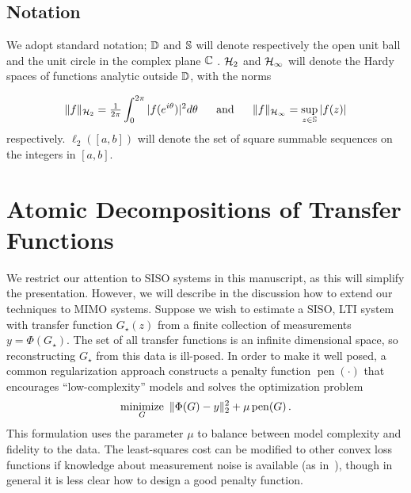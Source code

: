 \subsection*{Notation}\label{sec:notation}

We adopt standard notation; $\mathbb{D}$ and $\mathbb{S}$ will denote respectively the open
unit ball and the unit circle in the complex plane $\mathbb{C}$ . $\mathcal{H}_2$ and
$\mathcal{H}_\infty$ will denote the Hardy spaces of functions analytic outside $\mathbb{D}$,
with the norms

\[\|f\|_{\mathcal{H}_2} = \tfrac{1}{2\pi} \int_0^{2\pi} |f(e^{i\theta})|^2 d\theta~~~~~\mbox{and}~~~~~\|f\|_{\mathcal{H}_\infty} = \sup_{z\in\mathbb{S}} |f(z)|\]
respectively.  $\ell_2([a,b])$ will denote the set of square summable sequences on the integers in $[a, b]$.

\section{Atomic Decompositions of Transfer Functions}\label{sec:atomic-def}
We restrict our attention to SISO systems in this manuscript, as this will simplify the presentation.  However, we will describe in the discussion how to extend our techniques to MIMO systems.  Suppose we wish to estimate a SISO, LTI system with transfer function $G_\star(z)$ from a finite collection of measurements $y=\Phi(G_\star)$.  The set of all transfer functions is an infinite dimensional space, so reconstructing $G_\star$ from this data is ill-posed.  In order to make it well posed, a common regularization approach constructs a penalty function $\operatorname{pen}(\cdot)$ that encourages ``low-complexity'' models and solves the optimization problem
\begin{equation}\label{eq:regularized}
	\mathop{\operatorname{minimize}}_G~\|\Phi(G)-y\|_2^2 + \mu \operatorname{pen}(G) \,.
\end{equation}
This formulation uses the parameter $\mu$ to balance between model complexity and fidelity to the data.  The least-squares cost can be modified to other convex loss functions if knowledge about measurement noise is available (as in~\cite{Smith12,Paganini96}), though in general it is less clear how to design a good penalty function.

